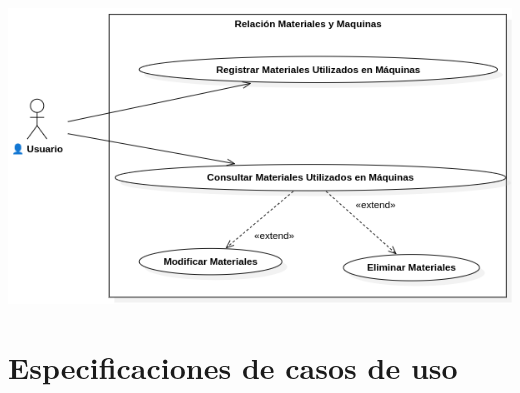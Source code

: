 \documentclass{article}
\begin{document}
\begin{center}
		\includegraphics[width=1\linewidth]{imagenes/cu_relacion_materiales_maquinas.png}
	\end{center}

\section{Especificaciones de casos de uso}
\end{document}

